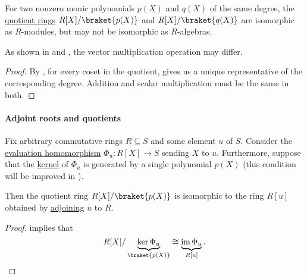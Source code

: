 \begin{corollary}\label{thm:polynomial_quotient_modules_vs_algebras}
  For two nonzero monic polynomials \( p(X) \) and \( q(X) \) of the same degree, the \hyperref[def:ring/quotient]{quotient rings} \( R[X] / \braket{ p(X) } \) and \( R[X] / \braket{ q(X) } \) are isomorphic as \( R \)-modules, but may not be isomorphic as \( R \)-algebras.
\end{corollary}
\begin{comments}
  \item As shown in  and , the vector multiplication operation may differ.
\end{comments}
\begin{proof}
  By , for every coset in the quotient,  gives us a unique representative of the corresponding degree. Addition and scalar multiplication must be the same in both.
\end{proof}

\paragraph{Adjoint roots and quotients}

\begin{proposition}\label{thm:adjoint_roots_and_quotients_general}
  Fix arbitrary commutative rings \( R \subseteq S \) and some element \( u \) of \( S \). Consider the \hyperref[def:algebra_over_ring/homomorphism]{evaluation homomorphism} \( \Phi_u: R[X] \to S \) sending \( X \) to \( u \). Furthermore, suppose that the \hyperref[def:ring/kernel]{kernel} of \( \Phi_u \) is generated by a single polynomial \( p(X) \) (this condition will be improved in ).

  Then the quotient ring \( R[X] / \braket{ p(X) } \) is isomorphic to the ring \( R[u] \) obtained by \hyperref[thm:adjoining_elements_to_semiring]{adjoining} \( u \) to \( R \).
\end{proposition}
\begin{proof}
   implies that
  \begin{equation*}
    R[X] / \underbrace{\ker \Phi_u}_{\braket{ p(X) }} \cong \underbrace{\img \Phi_u}_{R[u]}.
  \end{equation*}
\end{proof}

